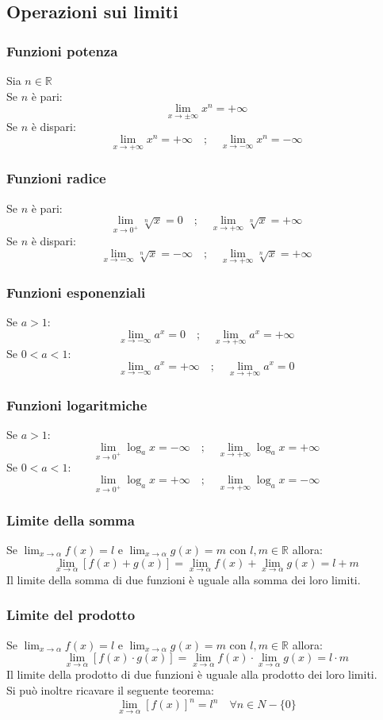 \documentclass[a4paper,14pt]{extarticle}
\newcommand{\R}{\mathbb{R}}
\begin{document}
\subsection{Operazioni sui limiti}
\subsubsection{Funzioni potenza}
Sia $n \in\R$ \\ Se $n$ è pari: \[ \lim_{x \to \pm \infty}x^n = +\infty \] Se $n$ è dispari: \[ \lim_{x \to +\infty}x^n = +\infty \quad;\quad  \lim_{x \to -\infty}x^n = -\infty\]
\subsubsection{Funzioni radice}
Se $n$ è pari: \[ \lim_{x \to 0^+} \sqrt[n]{x} = 0  \quad;\quad \lim_{x \to +\infty} \sqrt[n]{x} = +\infty\]
Se $n$ è dispari: \[ \lim_{x \to -\infty} \sqrt[n]{x} = -\infty  \quad;\quad \lim_{x \to +\infty} \sqrt[n]{x} = +\infty\]
\subsubsection{Funzioni esponenziali}
Se $a > 1$: \[ \lim_{x \to -\infty} a^x = 0 \quad;\quad \lim_{x \to +\infty} a^x = +\infty\]
Se $0 < a < 1$: \[ \lim_{x \to -\infty} a^x = +\infty \quad;\quad \lim_{x \to +\infty} a^x = 0\]
\subsubsection{Funzioni logaritmiche}
Se $a > 1$: \[ \lim_{x \to 0^+} \log_a x = -\infty \quad;\quad \lim_{x \to +\infty} \log_a x = +\infty\]
Se $0 < a < 1$: \[ \lim_{x \to 0^+} \log_a x = +\infty \quad;\quad \lim_{x \to +\infty} \log_a x = -\infty\]
\subsubsection{Limite della somma}
Se $\lim_{x \to \alpha}f(x) = l$ e $\lim_{x \to \alpha}g(x) = m$ con $l,m \in\R$ allora: \[ \lim_{x \to \alpha}[f(x) + g(x)] = \lim_{x \to \alpha}f(x) + \lim_{x \to \alpha}g(x) = l + m\] Il limite della somma di due funzioni è uguale alla somma dei loro limiti. 
\subsubsection{Limite del prodotto}
Se $\lim_{x \to \alpha}f(x) = l$ e $\lim_{x \to \alpha}g(x) = m$ con $l,m \in\R$ allora: \[ \lim_{x \to \alpha}[f(x) \cdot g(x)] = \lim_{x \to \alpha}f(x) \cdot \lim_{x \to \alpha}g(x) = l \cdot m\] Il limite della prodotto di due funzioni è uguale alla prodotto dei loro limiti. \\ Si può inoltre ricavare il seguente teorema: \[ \lim_{x \to \alpha}[f(x)]^n = l^n \quad \forall n \in N-\{0\}\] 
\end{document}
